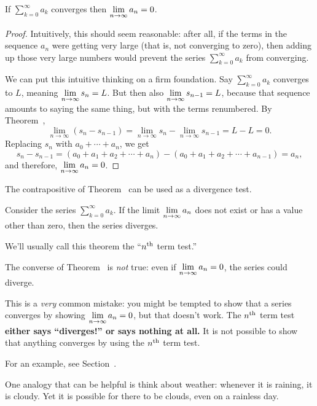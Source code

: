\begin{theorem}\label{thm:divergence-test} If $\sum_{k=0}^\infty a_k$
  converges then $\displaystyle\lim_{n\to\infty}a_n=0$.
\end{theorem}
\begin{proof} Intuitively, this should seem reasonable: after all, if
  the terms in the sequence $a_n$ were getting very large (that is,
  not converging to zero), then adding up those very large numbers
  would prevent the series $\sum_{k=0}^\infty a_k$ from converging.

  We can put this intuitive thinking on a firm foundation.  Say
  $\sum_{k=0}^\infty a_k$ converges to $L$, meaning
  $\displaystyle\lim_{n\to\infty}s_n=L$.  But then also
  $\displaystyle\lim_{n\to\infty}s_{n-1}=L$, because that sequence amounts to
  saying the same thing, but with the terms renumbered.  By
  Theorem~,
$$
  \lim_{n\to\infty} (s_{n}-s_{n-1})=
  \lim_{n\to\infty} s_{n}-\lim_{n\to\infty}s_{n-1}=L-L=0.
$$
Replacing $s_n$ with $a_0+\cdots+a_n$, we get
$$
  s_{n}-s_{n-1}=(a_0+a_1+a_2+\cdots+a_n)-(a_0+a_1+a_2+\cdots+a_{n-1})
  =a_n,
$$
and therefore, $\displaystyle\lim_{n\to\infty}a_n=0$.
\end{proof}

The contrapositive of Theorem~ can be used
as a divergence test.
\begin{theorem}\label{thm:nth-term-test}
Consider the series $\sum_{k=0}^\infty
a_k$. If the limit $\displaystyle\lim_{n\to\infty}a_n$ does not exist or has a value
other than zero, then the series diverges.
\end{theorem}
We'll usually call this theorem the ``$n^{\mbox{\scriptsize th}}$ term test.''

\begin{warning}
  The converse of Theorem~ is {\em not\/}
  true: even if $\displaystyle\lim_{n\to\infty}a_n=0$, the series could diverge.

  This is a \textit{very} common mistake: you might be tempted
  to show that a series converges by showing
  $\displaystyle\lim_{n\to\infty}a_n=0$, but that doesn't work.  The $n^{\mbox{\scriptsize th}}$
  term test \textbf{either says ``diverges!'' or says nothing at all.}
  It is not possible to show that anything converges by using the
  $n^{\mbox{\scriptsize th}}$ term test.

  For an example, see Section~.
\end{warning}

One analogy that can be helpful is think
about weather: whenever it is raining, it is cloudy.  Yet it is
possible for there to be clouds, even on a rainless day.  

